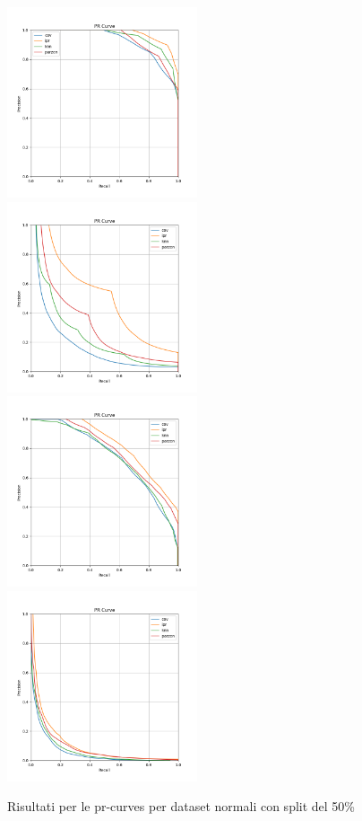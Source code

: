 \begin{figure}[!ht]
    \includegraphics[width=0.5\textwidth]{../images/toyexperiments/prcurves/PRCurve_k4_s1.png} 
    \includegraphics[width=0.5\textwidth]{../images/toyexperiments/prcurves/PRCurve_k4_s3.png}
    \includegraphics[width=0.5\textwidth]{../images/toyexperiments/prcurves/PRCurve_ksqrt_s1.png} 
    \includegraphics[width=0.5\textwidth]{../images/toyexperiments/prcurves/PRCurve_ksqrt_s3.png}
    \caption{Risultati per le pr-curves per dataset normali con split del 50\%} 
\end{figure}



